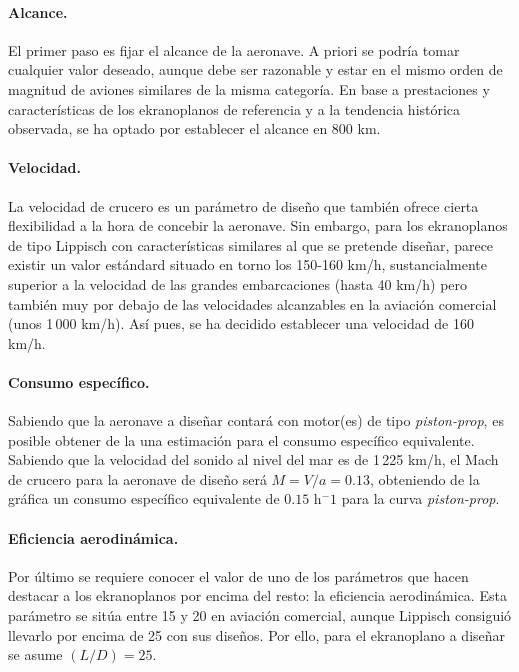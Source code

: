\paragraph{Alcance.} El primer paso es fijar el alcance de la aeronave. A priori se podría tomar cualquier valor deseado, aunque debe ser razonable y estar en el mismo orden de magnitud de aviones similares de la misma categoría. En base a prestaciones y características de los ekranoplanos de referencia y a la tendencia histórica observada, se ha optado por establecer el alcance en 800 km.

\paragraph{Velocidad.} La velocidad de crucero es un parámetro de diseño que también ofrece cierta flexibilidad a la hora de concebir la aeronave. Sin embargo, para los ekranoplanos de tipo Lippisch con características similares al que se pretende diseñar, parece existir un valor estándard situado en torno los 150-160 km/h, sustancialmente superior a la velocidad de las grandes embarcaciones (hasta 40 km/h) pero también muy por debajo de las velocidades alcanzables en la aviación comercial (unos 1\,000 km/h). Así pues, se ha decidido establecer una velocidad de 160 km/h.

\paragraph{Consumo específico.} Sabiendo que la aeronave a diseñar contará con motor(es) de tipo \emph{piston-prop}, es posible obtener de la  una estimación para el consumo específico equivalente. Sabiendo que la velocidad del sonido al nivel del mar es de 1\,225 km/h, el Mach de crucero para la aeronave de diseño será $M=V/a=0.13$, obteniendo de la gráfica un consumo específico equivalente de $0.15$ h$^-1$ para la curva \emph{piston-prop}.

\paragraph{Eficiencia aerodinámica.} Por último se requiere conocer el valor de uno de los parámetros que hacen destacar a los ekranoplanos por encima del resto: la eficiencia aerodinámica. Esta parámetro se sitúa entre 15 y 20 en aviación comercial, aunque Lippisch consiguió llevarlo por encima de 25 con sus diseños. Por ello, para el ekranoplano a diseñar se asume $\left(L/D\right) = 25$.

